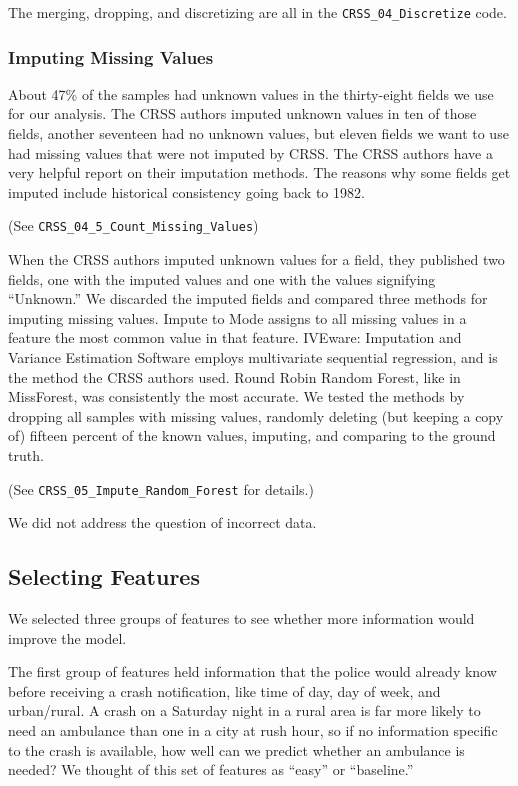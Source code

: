 The merging, dropping, and discretizing are all in the \verb|CRSS_04_Discretize| code.

\subsubsection{Imputing Missing Values}

About 47\% of the samples had unknown values in the thirty-eight fields we use for our analysis.   The CRSS authors imputed unknown values in ten of those fields, another seventeen had no unknown values, but eleven fields we want to use had missing values that were not imputed by CRSS.   The CRSS authors have a very helpful report on their imputation methods.  \citep{CRSS_Imputation}  The reasons why some fields get imputed include historical consistency going back to 1982.  

(See \verb|CRSS_04_5_Count_Missing_Values|)  

When the CRSS authors imputed unknown values for a field, they published two fields, one with the imputed values and one with the values signifying ``Unknown.''  We discarded the imputed fields and compared three methods for imputing missing values.  Impute to Mode assigns to all missing values in a feature the most common value in that feature.  IVEware: Imputation and Variance Estimation Software employs multivariate sequential regression, and is the method the CRSS authors used.  Round Robin Random Forest, like in MissForest, was consistently the most accurate.  We tested the methods by dropping all samples with missing values, randomly deleting (but keeping a copy of) fifteen percent of the known values, imputing, and comparing to the ground truth.  

(See \verb|CRSS_05_Impute_Random_Forest| for details.)

We did not address the question of incorrect data.  

\subsection{Selecting Features}

We selected three groups of features to see whether more information would improve the model.  

The first group of features held information that the police would already know before receiving a crash notification, like time of day, day of week, and urban/rural.  A crash on a Saturday night in a rural area is far more likely to need an ambulance than one in a city at rush hour, so if no information specific to the crash is available, how well can we predict whether an ambulance is needed?  We thought of this set of features as ``easy'' or ``baseline.''

